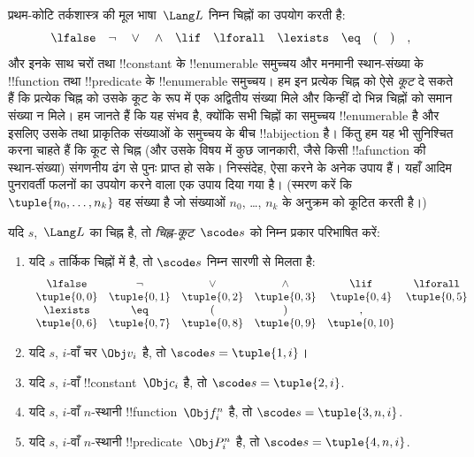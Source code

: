 \documentclass[../../../include/open-logic-section]{subfiles}
\begin{document}

प्रथम-कोटि तर्कशास्त्र की मूल भाषा~$\Lang L$ निम्न चिह्नों का उपयोग करती है:
\[
\lfalse \quad \lnot \quad \lor \quad \land \quad \lif \quad \lforall
\quad \lexists \quad \eq \quad ( \quad ) \quad ,
\]
और इनके साथ चरों तथा !!{constant} के !!{enumerable} समुच्चय और मनमानी
स्थान-संख्या के !!{function} तथा !!{predicate} के !!{enumerable} समुच्चय।
हम इन प्रत्येक चिह्न को ऐसे \emph{कूट} दे सकते हैं कि प्रत्येक चिह्न को उसके
कूट के रूप में एक अद्वितीय संख्या मिले और किन्हीं दो भिन्न चिह्नों को समान
संख्या न मिले। हम जानते हैं कि यह संभव है, क्योंकि सभी चिह्नों का समुच्चय
!!{enumerable} है और इसलिए उसके तथा प्राकृतिक संख्याओं के समुच्चय के बीच
!!a{bijection} है। किंतु हम यह भी सुनिश्चित करना चाहते हैं कि कूट से चिह्न
(और उसके विषय में कुछ जानकारी, जैसे किसी !!a{function} की स्थान-संख्या)
संगणनीय ढंग से पुनः प्राप्त हो सके। निस्संदेह, ऐसा करने के अनेक उपाय हैं। यहाँ
आदिम पुनरावर्ती फलनों का उपयोग करने वाला एक उपाय दिया गया है। (स्मरण करें कि
$\tuple{n_0, \dots, n_k}$ वह संख्या है जो संख्याओं $n_0$, \dots, $n_k$ के
अनुक्रम को कूटित करती है।)

\begin{defn}
यदि $s$,~$\Lang L$ का चिह्न है, तो \emph{चिह्न-कूट}~$\scode s$ को निम्न
प्रकार परिभाषित करें:
\begin{enumerate}
\item यदि $s$ तार्किक चिह्नों में है, तो $\scode s$ निम्न सारणी से मिलता है:
\[
\begin{array}{cccccccccc}
  \lfalse & \lnot & \lor & \land & \lif & \lforall \\
\tuple{0, 0} & \tuple{0, 1} & \tuple{0, 2} & \tuple{0, 3} &
\tuple{0, 4} & \tuple{0, 5} \\
\lexists & \eq & ( & ) & ,\\
\tuple{0, 6} & \tuple{0, 7} &
\tuple{0, 8} & \tuple{0, 9} & \tuple{0, 10}
\end{array}
\]
\item यदि $s$, $i$-वाँ चर $\Obj v_i$ है, तो $\scode s = \tuple{1, i}$।
\item यदि $s$, $i$-वाँ !!{constant}~$\Obj c_i$ है, तो
  $\scode s = \tuple{2, i}$.
\item यदि $s$, $i$-वाँ $n$-स्थानी !!{function}~$\Obj f_i^n$ है, तो
  $\scode s = \tuple{3, n, i}$.
\item यदि $s$, $i$-वाँ $n$-स्थानी !!{predicate}~$\Obj P_i^n$ है, तो
  $\scode s = \tuple{4, n, i}$.
\end{enumerate}
\end{defn}
\end{document}
